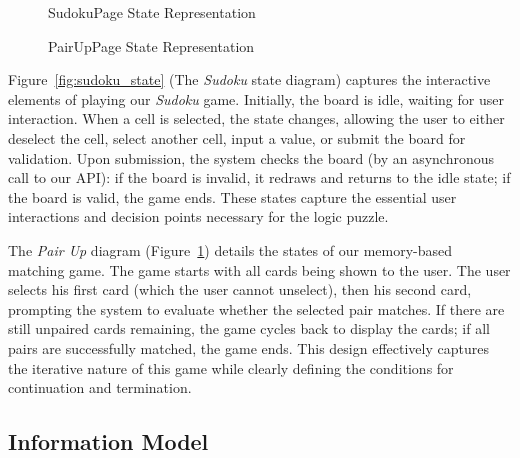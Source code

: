 \documentclass[11pt,a4paper]{article}
\newcommand{\inputdiagram}[1]{}
\newcommand{\textwidthdiagram}[2][1]{%
  \resizebox{#1\textwidth}{!}{\inputdiagram{#2}}%
}
\begin{document}
\begin{figure}[H]
    \centering
    \begin{minipage}[b]{0.48\textwidth}
        \centering
        \textwidthdiagram{sudoku_state.tex}
        \caption{SudokuPage State Representation}
        \label{fig:sudoku_state}
    \end{minipage}
    \hfil
    \begin{minipage}[b]{0.48\textwidth}
        \centering
        \textwidthdiagram{pair_up_state.tex}
        \caption{PairUpPage State Representation}
        \label{fig:pair_up_state}
    \end{minipage}
\end{figure}

Figure~\ref{fig:sudoku_state} (The \textit{Sudoku} state diagram) captures
the interactive elements of playing our \textit{Sudoku} game. Initially, the board
is idle, waiting for user interaction. When a cell is selected, the state
changes, allowing the user to either deselect the cell, select another
cell, input a value, or submit the board for validation. Upon submission,
the system checks the board (by an asynchronous call to our API): if the
board is invalid, it redraws and returns to the idle state; if the board
is valid, the game ends. These states capture the essential user interactions
and decision points necessary for the logic puzzle.

The \textit{Pair Up} diagram (Figure~\ref{fig:pair_up_state}) details the
states of our memory-based matching game. The game starts with all cards being
shown to the user. The user selects his first card (which the user cannot
unselect), then his second card, prompting the system to evaluate whether the
selected pair matches. If there are still unpaired cards remaining, the game cycles
back to display the cards; if all pairs are successfully matched,
the game ends. This design effectively captures the iterative nature of this
game while clearly defining the conditions for continuation and termination.


\subsection{Information Model}
\end{document}
